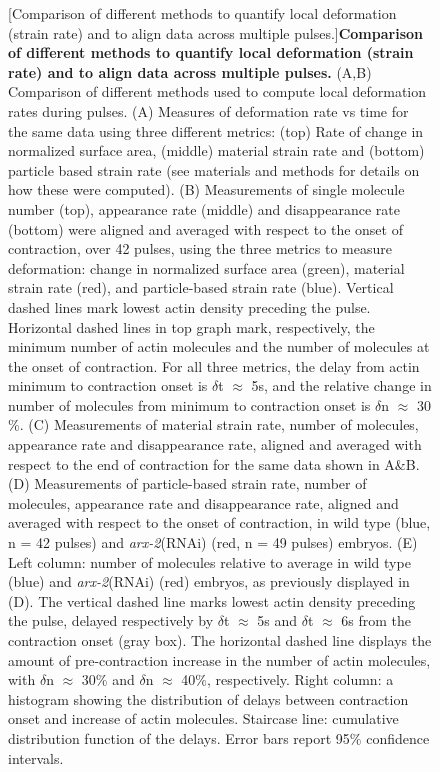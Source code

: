 \documentclass{ucetd}
\begin{document}
{{{{\begin{figure}[!htbp]
[Comparison of different methods to quantify local deformation (strain rate) and to align data across multiple pulses.]{\textbf{Comparison of different methods to quantify local deformation (strain rate) and to align data across multiple pulses.} (A,B) Comparison of different methods used to compute local deformation rates during pulses. (A) Measures of deformation rate vs time for the same data using three different metrics: (top) Rate of change in normalized surface area, (middle) material strain rate and (bottom) particle based strain rate (see materials and methods for details on how these were computed). (B) Measurements of single molecule number (top), appearance rate (middle) and disappearance rate (bottom) were aligned and averaged with respect to the onset of contraction, over 42 pulses, using the three metrics to measure deformation: change in normalized surface area (green), material strain rate (red), and particle-based strain rate (blue). Vertical dashed lines mark lowest actin density preceding the pulse. Horizontal dashed lines in top graph mark, respectively, the minimum number of actin molecules and the number of molecules at the onset of contraction. For all three metrics, the delay from actin minimum to contraction onset is $\delta$t $\approx$ 5s, and the relative change in number of molecules from minimum to contraction onset is $\delta$n $\approx$ 30$\%$. (C) Measurements of material strain rate, number of molecules, appearance rate and disappearance rate, aligned and averaged with respect to the end of contraction for the same data shown in A&B. (D) Measurements of particle-based strain rate, number of molecules, appearance rate and disappearance rate, aligned and averaged with respect to the onset of contraction, in wild type (blue, n = 42 pulses) and \textit{arx-2}(RNAi) (red, n = 49 pulses) embryos. (E) Left column: number of molecules relative to average in wild type (blue) and \textit{arx-2}(RNAi) (red) embryos, as previously displayed in (D). The vertical dashed line marks lowest actin density preceding the pulse, delayed respectively by $\delta$t $\approx$ 5s and $\delta$t $\approx$ 6s from the contraction onset (gray box). The horizontal dashed line displays the amount of pre-contraction increase in the number of actin molecules, with $\delta$n $\approx$ 30$\%$ and $\delta$n $\approx$ 40$\%$, respectively. Right column: a histogram showing the distribution of delays between contraction onset and increase of actin molecules. Staircase line: cumulative distribution function of the delays. Error bars report 95$\%$ confidence intervals.}
\end{figure}







}}}}
\end{document}
